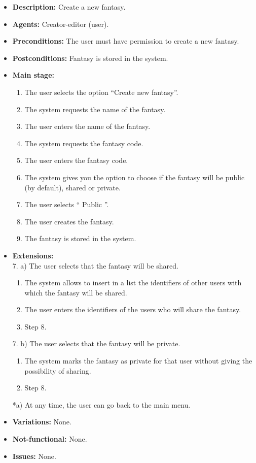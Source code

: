 \begin{itemize}
	\item \textbf{Description:} Create a new fantasy.
	\item \textbf{Agents:} Creator-editor (user).
	\item \textbf{Preconditions:} The user must have permission to create a new fantasy.
	\item \textbf{Postconditions:} Fantasy is stored in the system.
	\item \textbf{Main stage:}
	\begin{enumerate}
		\item The user selects the option ``Create new fantasy''.
		\item The system requests the name of the fantasy.
		\item The user enters the name of the fantasy.
		\item The system requests the fantasy code.
		\item The user enters the fantasy code.
		\item The system gives you the option to choose if the fantasy will be public (by default), shared or private.
		\item The user selects `` Public ''.
		\item The user creates the fantasy.
		\item The fantasy is stored in the system.
	\end{enumerate}
	\item \textbf{Extensions:} \\7. a) The user selects that the fantasy will be shared.
	\begin{enumerate}
		\item The system allows to insert in a list the identifiers of other users with which the fantasy will be shared.
		\item The user enters the identifiers of the users who will share the fantasy.
		\item Step 8.
	\end{enumerate}
	7. b) The user selects that the fantasy will be private.
	\begin{enumerate}
		\item The system marks the fantasy as private for that user without giving the possibility of sharing.
		\item Step 8.
	\end{enumerate}
	*a) At any time, the user can go back to the main menu.
	\item \textbf{Variations:} None.
	\item \textbf{Not-functional:} None.
	\item \textbf{Issues:} None.
\end{itemize}

